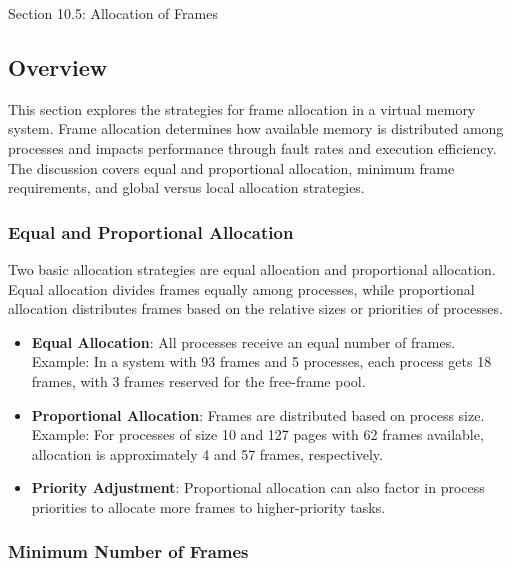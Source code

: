 \begin{notes}{Section 10.5: Allocation of Frames}
    \subsection*{Overview}

    This section explores the strategies for frame allocation in a virtual memory system. Frame allocation determines how available memory is distributed among processes and impacts performance through 
    fault rates and execution efficiency. The discussion covers equal and proportional allocation, minimum frame requirements, and global versus local allocation strategies.
    
    \subsubsection*{Equal and Proportional Allocation}
    
    Two basic allocation strategies are equal allocation and proportional allocation. Equal allocation divides frames equally among processes, while proportional allocation distributes frames based on 
    the relative sizes or priorities of processes.
    
    \begin{highlight}
    
    \begin{itemize}
        \item \textbf{Equal Allocation}: All processes receive an equal number of frames. Example: In a system with 93 frames and 5 processes, each process gets 18 frames, with 3 frames reserved for 
        the free-frame pool.
        \item \textbf{Proportional Allocation}: Frames are distributed based on process size. Example: For processes of size 10 and 127 pages with 62 frames available, allocation is approximately 4 
        and 57 frames, respectively.
        \item \textbf{Priority Adjustment}: Proportional allocation can also factor in process priorities to allocate more frames to higher-priority tasks.
    \end{itemize}
    
    \end{highlight}
    
    \subsubsection*{Minimum Number of Frames}
    

\end{notes}
